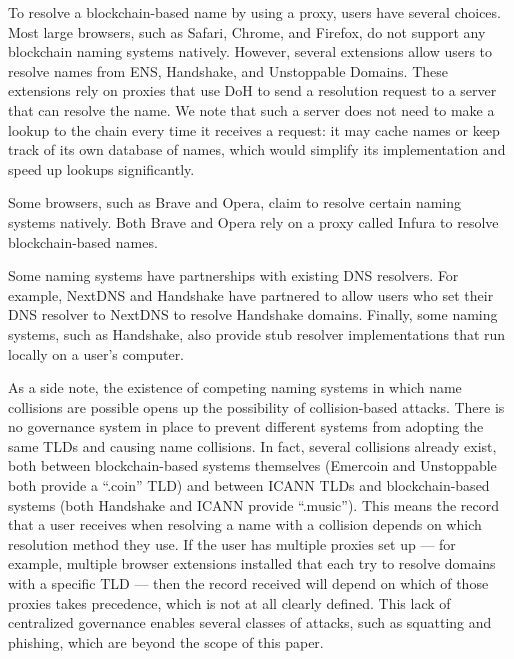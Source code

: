 To resolve a blockchain-based name by using a proxy, users have several 
choices. Most large 
browsers, such as Safari, Chrome, and Firefox, do not support any 
blockchain 
naming systems natively. However, several extensions allow users to resolve 
names from ENS, 
Handshake, and Unstoppable Domains. These extensions rely on proxies that 
use 
DoH to send a resolution request to a server that can resolve the name. We 
note that such a server does not need to make a lookup to the chain every time 
it receives a request: it may cache names or keep track of its own database 
of 
names, which would simplify its implementation and speed up lookups 
significantly. 

Some browsers, such as Brave and Opera, claim to resolve certain naming 
systems 
natively.  Both Brave and Opera rely on a proxy called 
Infura to resolve blockchain-based names.  

Some naming systems have partnerships with existing DNS resolvers. For 
example, 
NextDNS and Handshake have partnered to allow users who set their DNS resolver 
to NextDNS to resolve Handshake domains. Finally, some naming systems, 
such as 
Handshake, also provide stub resolver implementations that run locally on a 
user's computer. 

As a side note, the existence of competing naming systems in which name 
collisions are possible 
opens up the possibility of collision-based attacks. There is no governance 
system in place to prevent different systems from adopting the same TLDs and 
causing name collisions. In fact, several collisions already exist, both 
between blockchain-based systems themselves (Emercoin and Unstoppable both 
provide a ``.coin'' TLD) and between ICANN TLDs and blockchain-based systems 
(both Handshake and ICANN provide ``.music''). 
This means the record that a user receives when resolving a name with a 
collision depends on which resolution method they use. If the user has 
multiple 
proxies set up --- for example, multiple browser extensions installed that 
each 
try to resolve domains with a specific TLD --- then the record received will 
depend on which of those proxies takes precedence, which is not at all 
clearly 
defined. This lack of centralized governance enables several classes of 
attacks, such as squatting 
and phishing, which are beyond the scope of this paper.

